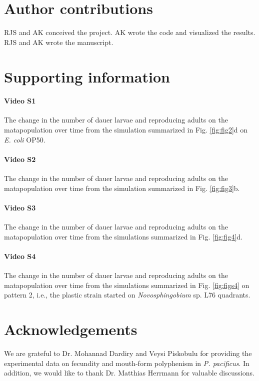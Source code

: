 \documentclass[10pt,letterpaper]{article}
\newcommand{\ecoli}{\emph{E. coli} OP50}
\newcommand{\novo}{\emph{Novosphingobium} sp. L76}
\newcommand{\ppac}{\emph{P. pacificus}}
\begin{document}
\section*{Author contributions}

RJS and AK conceived the project. AK wrote the code and visualized the results. RJS and AK wrote the manuscript.

\section*{Supporting information}

\paragraph*{Video S1} 
\label{S1_Video}
{The change in the number of dauer larvae and reproducing adults on the matapopulation over time from the simulation summarized in Fig. \ref{fig:fig2}d on \ecoli{}.}

\paragraph*{Video S2} 
\label{S2_Video}
{The change in the number of dauer larvae and reproducing adults on the matapopulation over time from the simulation summarized in Fig. \ref{fig:fig3}b.}

\paragraph*{Video S3} 
\label{S3_Video}
{The change in the number of dauer larvae and reproducing adults on the matapopulation over time from the simulations summarized in Fig. \ref{fig:fig4}d.}

\paragraph*{Video S4} 
\label{S4_Video}
{The change in the number of dauer larvae and reproducing adults on the matapopulation over time from the simulations summarized in Fig. \ref{fig:figs4} on pattern 2, i.e., the plastic strain started on \novo{} quadrants.}

\section*{Acknowledgements}

We are grateful to Dr. Mohannad Dardiry and Veysi Piskobulu for providing the experimental data on fecundity and mouth-form polyphenism in \ppac{}. In addition, we would like to thank Dr. Matthias Herrmann for valuable discussions.
\end{document}
